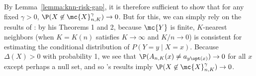 \documentclass[11pt]{article}
\newcommand{\tloss}{\ell}  %
\newcommand{\difftrisk}{D_\tloss}  %
\begin{document}
By Lemma~\ref{lemma:knn-risk-gap}, it is therefore sufficient
to show that for any fixed $\gamma > 0$,
$\P(X \not \in \mc{X}_{n,K}^\gamma) \to 0$.
%
But for this, we can simply rely on the results of \citet{Stone77}: by his
Theorems 1 and 2, because $\mc{Y}$ is finite,
$K$-nearest neighbors (when $K = K(n)$ satisfies $K \to \infty$ and
$K/n \to 0$) is consistent for estimating the conditional
distribution of $P(Y = y \mid X = x)$.
%
Because $\Delta(X) > 0$ with probability 1,
we see that $\P(A_{n,K}(x) \neq a_{y\opt(x)}) \to 0$ for all $x$ except
perhaps a null set,
and so \citeauthor{Stone77}'s results imply
$\P(X \not \in \mc{X}_{n,K}^\gamma) \to 0$.

\end{document}
